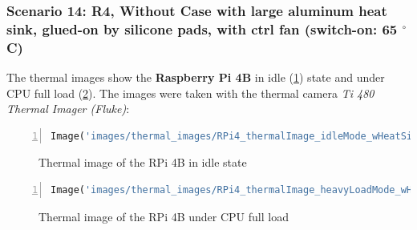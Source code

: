 \documentclass[10pt,parskip=half,
toc=sectionentrywithdots,
bibliography=totocnumbered,
captions=tableheading,numbers=noendperiod]{scrartcl}
\begin{document}
\hypertarget{scenario-14-r4-without-case-with-large-aluminum-heat-sink-glued-on-by-silicone-pads-with-ctrl-fan-switch-on-65-circc}{%
\subsubsection{\texorpdfstring{Scenario 14: R4, Without Case with large
aluminum heat sink, glued-on by silicone pads, with ctrl fan (switch-on:
65
\(^\circ\)C)}{Scenario 14: R4, Without Case with large aluminum heat sink, glued-on by silicone pads, with ctrl fan (switch-on: 65 \^{}\textbackslash circC)}}\label{scenario-14-r4-without-case-with-large-aluminum-heat-sink-glued-on-by-silicone-pads-with-ctrl-fan-switch-on-65-circc}}

The thermal images show the \textbf{Raspberry Pi 4B} in idle
(\cref{fig:thermo_rpi4_idle}) state and under CPU full load
(\cref{fig:thermo_rpi4_stress}). The images were taken with the thermal
camera \emph{Ti 480 Thermal Imager (Fluke)}:

\begin{lstlisting}[language=Python,numbers=left,xleftmargin=20pt,xrightmargin=5pt,belowskip=5pt,aboveskip=5pt]
Image('images/thermal_images/RPi4_thermalImage_idleMode_wHeatSinkAndCtrlFan5V.jpg', height=400)
\end{lstlisting}

    \begin{figure}[h!]\begin{center}\end{center}\caption{Thermal image of the RPi 4B in idle state}\label{fig:thermo_rpi4_idle}\end{figure}

\begin{lstlisting}[language=Python,numbers=left,xleftmargin=20pt,xrightmargin=5pt,belowskip=5pt,aboveskip=5pt]
Image('images/thermal_images/RPi4_thermalImage_heavyLoadMode_wHeatSinkAndCtrlFan5V.jpg', height=400)
\end{lstlisting}

    \begin{figure}[h!]\begin{center}\end{center}\caption{Thermal image of the RPi 4B under CPU full load}\label{fig:thermo_rpi4_stress}\end{figure}
\end{document}
